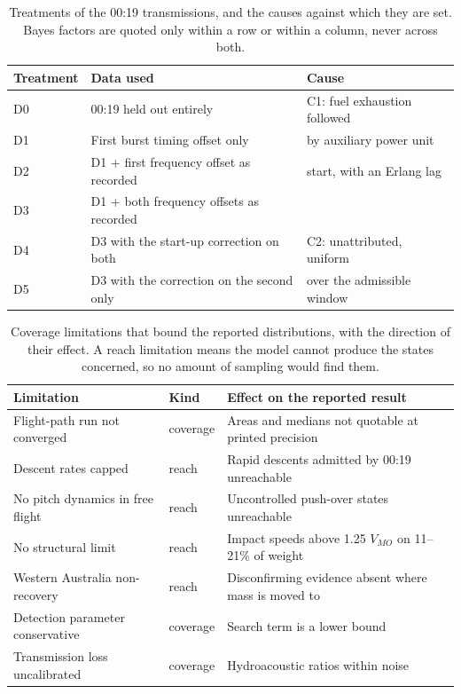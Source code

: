 \documentclass[12pt,a4paper]{article}
\begin{document}
\begin{table}[htbp]
\centering
\caption{Treatments of the 00:19 transmissions, and the causes against which they are set. Bayes
factors are quoted only within a row or within a column, never across both.}
\vspace{4pt}
\small
\begin{tabular}{@{}p{1.6cm}p{8.6cm}p{4.4cm}@{}}
\toprule
Treatment & Data used & Cause \\
\midrule
D0 & 00:19 held out entirely & C1: fuel exhaustion followed \\
D1 & First burst timing offset only & \quad by auxiliary power unit \\
D2 & D1 + first frequency offset as recorded & \quad start, with an Erlang lag \\
D3 & D1 + both frequency offsets as recorded & \\
D4 & D3 with the start-up correction on both & C2: unattributed, uniform \\
D5 & D3 with the correction on the second only & \quad over the admissible window \\
\bottomrule
\end{tabular}
\end{table}

\begin{table}[htbp]
\centering
\caption{Coverage limitations that bound the reported distributions, with the direction of their
effect. A reach limitation means the model cannot produce the states concerned, so no amount of
sampling would find them.}
\vspace{4pt}
\small
\begin{tabular}{@{}p{5.4cm}p{2.2cm}p{7.0cm}@{}}
\toprule
Limitation & Kind & Effect on the reported result \\
\midrule
Flight-path run not converged & coverage & Areas and medians not quotable at printed precision \\
Descent rates capped & reach & Rapid descents admitted by 00:19 unreachable \\
No pitch dynamics in free flight & reach & Uncontrolled push-over states unreachable \\
No structural limit & reach & Impact speeds above 1.25 $V_{MO}$ on 11--21\% of weight \\
Western Australia non-recovery & reach & Disconfirming evidence absent where mass is moved to \\
Detection parameter conservative & coverage & Search term is a lower bound \\
Transmission loss uncalibrated & coverage & Hydroacoustic ratios within noise \\
\bottomrule
\end{tabular}
\end{table}
\end{document}
